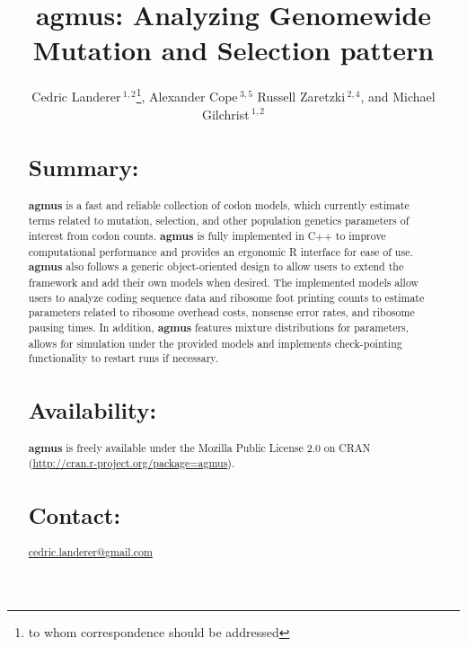 \documentclass{bioinfo}
\newcommand{\pkg}[1]{{\fontseries{b}\selectfont #1}}
\newcommand{\package}{\textbf{agmus }} %
\begin{document}

\title[agmus]{agmus: Analyzing Genomewide Mutation and Selection pattern}
\author[
Landerer \textit{et~al}]{Cedric Landerer\,$^{1,2}$\footnote{
to whom correspondence should be addressed
},
Alexander Cope\,$^{3,5}$
Russell Zaretzki\,$^{2,4}$, and
Michael Gilchrist\,$^{1,2}$
}
\address{$^{1}$
Department of Ecology and Evolutionary Biology,
$^{2}$National Institute for Mathematical and Biological Synthesis,
$^{3}$Genome Science and Technology
$^{4}$Department of Statistics, Operations, and Management Science,
University of Tennessee, Knoxville, TN, USA,
$^{5}$Oak Ridge National Laboratory, Oak Ridge, TN, USA} 


\maketitle

\begin{abstract}

\section{Summary:}
\pkg{\package} is a fast and reliable collection of codon models, which currently estimate terms related to mutation, selection, and other population genetics parameters of interest from codon counts.
\package is fully implemented in C++ to improve computational performance and provides an ergonomic R interface for ease of use. 
\package also follows a generic object-oriented design to allow users to extend the framework and add their own models when desired.
The implemented models allow users to analyze coding sequence data and ribosome foot printing counts to estimate parameters related to ribosome overhead costs, nonsense error rates, and ribosome pausing times. 
In addition, \package features mixture distributions for parameters, allows for simulation under the provided models and implements check-pointing functionality to restart runs if necessary. 

\section{Availability:}
\pkg{\package} is freely available under the Mozilla Public License 2.0
on CRAN (\url{http://cran.r-project.org/package=agmus}).

\section{Contact:} \href{cedric.landerer@gmail.com}{cedric.landerer@gmail.com}
\end{abstract}
\end{document}
